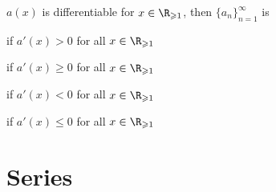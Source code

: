 \documentclass{article}
\begin{document}
\begin{multicols}{2}
\begin{tcolorboxcols}[title={Derivative Test}]
\begin{theorem}
            $a(x)$ is differentiable for $x\in\R_{\geqslant1}$,
            then $\{a_n\}^\infty_{n=1}$ is
        \end{theorem}
        \begin{description}[style=sameline]
            \item[Strictly increasing] if $a'(x) > 0$ for all $x\in\R_{\geqslant 1}$
            \item[Increasing] if $a'(x) \geqslant 0$ for all $x\in\R_{\geqslant 1}$
            \item[Strictly decreasing] if $a'(x) < 0$ for all $x\in\R_{\geqslant 1}$
            \item[Decreasing] if $a'(x) \leqslant 0$ for all $x\in\R_{\geqslant 1}$
        \end{description}
    \end{tcolorboxcols}
\end{multicols}
%
\pagebreak
\section{Series}
\end{document}
